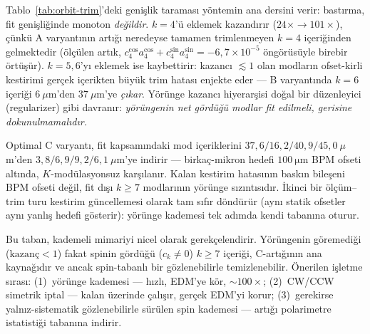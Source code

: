 \documentclass[preprint,12pt]{elsarticle}
\begin{document}
Tablo~\ref{tab:orbit-trim}'deki genişlik taraması yöntemin ana dersini
verir: bastırma, fit genişliğinde monoton \emph{değildir}. $k=4$'ü
eklemek kazandırır ($24\times\to101\times$), çünkü A varyantının artığı
neredeyse tamamen trimlenmeyen $k=4$ içeriğinden gelmektedir (ölçülen
artık, $c_4^{\cos}a_4^{\cos}+c_4^{\sin}a_4^{\sin}=-6{,}7\times10^{-5}$
öngörüsüyle birebir örtüşür). $k=5,6$'yı eklemek ise kaybettirir:
kazancı $\lesssim1$ olan modların ofset-kirli kestirimi gerçek içerikten
büyük trim hatası enjekte eder — B varyantında $k=6$ içeriği
$6~\mu$m'den $37~\mu$m'ye \emph{çıkar}. Yörünge kazancı hiyerarşisi
doğal bir düzenleyici (regularizer) gibi davranır: \emph{yörüngenin net
gördüğü modlar fit edilmeli, gerisine dokunulmamalıdır.}

Optimal C varyantı, fit kapsamındaki mod içeriklerini
$37{,}6/16{,}2/40{,}9/45{,}0~\mu$m'den
$3{,}8/6{,}9/9{,}2/6{,}1~\mu$m'ye indirir — birkaç-mikron hedefi
$\SI{100}{\micro\meter}$ BPM ofseti altında, $K$-modülasyonsuz
karşılanır. Kalan kestirim hatasının baskın bileşeni BPM ofseti değil,
fit dışı $k\ge7$ modlarının yörünge sızıntısıdır. İkinci bir
ölçüm--trim turu kestirim güncellemesi olarak tam sıfır döndürür
(aynı statik ofsetler aynı yanlış hedefi gösterir): yörünge kademesi
tek adımda kendi tabanına oturur.

Bu taban, kademeli mimariyi nicel olarak gerekçelendirir. Yörüngenin
göremediği ($\mathrm{kazanç}<1$) fakat spinin gördüğü ($c_k\neq0$)
$k\ge7$ içeriği, C-artığının ana kaynağıdır ve ancak spin-tabanlı bir
gözlenebilirle temizlenebilir. Önerilen işletme sırası: (1)~yörünge
kademesi — hızlı, EDM'ye kör, $\sim100\times$; (2)~CW/CCW simetrik
iptal — kalan üzerinde çalışır, gerçek EDM'yi korur;
(3)~gerekirse yalnız-sistematik gözlenebilirle sürülen spin kademesi —
artığı polarimetre istatistiği tabanına indirir.
\end{document}

